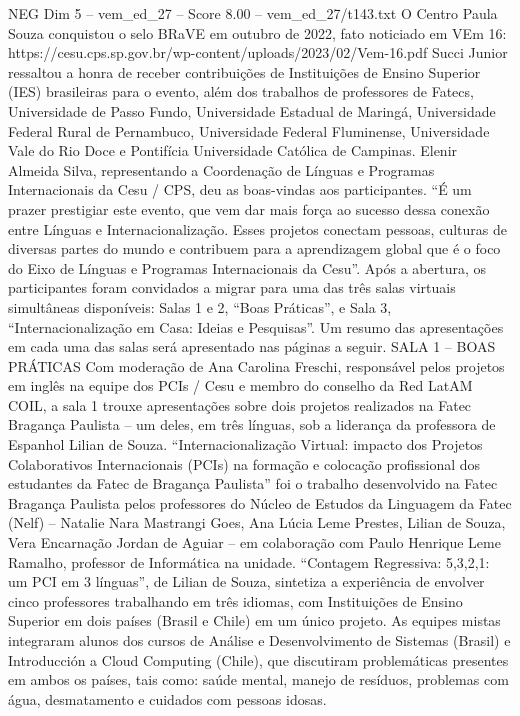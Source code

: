\begin{textsample}{NEG Dim 5 – vem\_ed\_27 – Score 8.00 – vem\_ed\_27/t143.txt}
O Centro Paula Souza conquistou o selo BRaVE em outubro de 2022, fato noticiado em VEm 16: https://cesu.cps.sp.gov.br/wp-content/uploads/2023/02/Vem-16.pdf Succi Junior ressaltou a honra de receber contribuições de Instituições de Ensino Superior (IES) brasileiras para o evento, além dos trabalhos de professores de Fatecs, Universidade de Passo Fundo, Universidade Estadual de Maringá, Universidade Federal Rural de Pernambuco, Universidade Federal Fluminense, Universidade Vale do Rio Doce e Pontifícia Universidade Católica de Campinas.
Elenir Almeida Silva, representando a Coordenação de Línguas e Programas Internacionais da Cesu / CPS, deu as boas-vindas aos participantes. “É um prazer prestigiar este evento, que vem dar mais força ao sucesso dessa conexão entre Línguas e Internacionalização.
Esses projetos conectam pessoas, culturas de diversas partes do mundo e contribuem para a aprendizagem global que é o foco do Eixo de Línguas e Programas Internacionais da Cesu”.
Após a abertura, os participantes foram convidados a migrar para uma das três salas virtuais simultâneas disponíveis: Salas 1 e 2, “Boas Práticas”, e Sala 3, “Internacionalização em Casa: Ideias e Pesquisas”.
Um resumo das apresentações em cada uma das salas será apresentado nas páginas a seguir.
SALA 1 – BOAS PRÁTICAS Com moderação de Ana Carolina Freschi, responsável pelos projetos em inglês na equipe dos PCIs / Cesu e membro do conselho da Red LatAM COIL, a sala 1 trouxe apresentações sobre dois projetos realizados na Fatec Bragança Paulista – um deles, em três línguas, sob a liderança da professora de Espanhol Lilian de Souza. “Internacionalização Virtual: impacto dos Projetos Colaborativos Internacionais (PCIs) na formação e colocação profissional dos estudantes da Fatec de Bragança Paulista” foi o trabalho desenvolvido na Fatec Bragança Paulista pelos professores do Núcleo de Estudos da Linguagem da Fatec (Nelf) – Natalie Nara Mastrangi Goes, Ana Lúcia Leme Prestes, Lilian de Souza, Vera Encarnação Jordan de Aguiar – em colaboração com Paulo Henrique Leme Ramalho, professor de Informática na unidade. “Contagem Regressiva: 5,3,2,1: um PCI em 3 línguas”, de Lilian de Souza, sintetiza a experiência de envolver cinco professores trabalhando em três idiomas, com Instituições de Ensino Superior em dois países (Brasil e Chile) em um único projeto.
As equipes mistas integraram alunos dos cursos de Análise e Desenvolvimento de Sistemas (Brasil) e Introducción a Cloud Computing (Chile), que discutiram problemáticas presentes em ambos os países, tais como: saúde mental, manejo de resíduos, problemas com água, desmatamento e cuidados com pessoas idosas.

\end{textsample}
